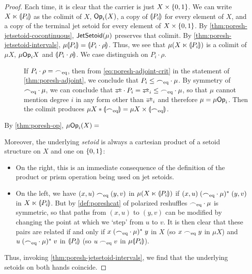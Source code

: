 \documentclass[a4paper]{memoir}
\begin{document}
\begin{proof}
	Each time, it is clear that the carrier is just $X \times \mathopen{}\left\{ 0, 1 \right\}\mathclose{}$.
	We can write $X \ltimes {\llparenthesis P_i \rrparenthesis}$ as the colimit of $X$, ${\mathsf{Op}}_i(X)$, a copy of ${\llparenthesis P_i \rrparenthesis}$ for every element of $X$, and a copy of the terminal jet setoid for every element of $X \times \mathopen{}\left\{ 0, 1 \right\}\mathclose{}$.
	By \cref{thm:poresh-jetsetoid-cocontinuous}, $\mathsf{JetSetoid}(\mu)$ preserves that colimit.
	By \cref{thm:poresh-jetsetoid-intervals}, $\mu {\llparenthesis P_i \rrparenthesis} = {\llparenthesis P_i \cdot \rho \rrparenthesis}$.
	Thus, we see that $\mu (X \ltimes {\llparenthesis P_i \rrparenthesis})$ is a colimit of $\mu X$, $\mu {\mathsf{Op}}_i X$ and ${\llparenthesis P_i \cdot \rho \rrparenthesis}$.
	We case distinguish on $P_i \cdot \rho$.
	\begin{description}
		\item[\framebox{$\eqtysym$}] If $P_i \cdot \rho = {\frown}_{{\mathrm{eq}}}$, then from \cref{eq:poresh-adjoint-crit} in the statement of \cref{thm:poresh-adjoint}, we conclude that $P_i \leq {\frown}_{{\mathrm{eq}}} \cdot \mu$.
		By symmetry of ${\frown}_{{\mathrm{eq}}} \cdot \mu$, we can conclude that $\infrajetsym \cdot P_i = \infrajetsym_i \leq \eqtysym \cdot \mu$, so that $\mu$ cannot mention degree $i$ in any form other than $\infrajetsym_i$ and therefore $\mu = \mu {\mathsf{Op}}_i$. Then the colimit produces $\mu X * {\llparenthesis \frown_{{\mathrm{eq}}} \rrparenthesis} = \mu X \times {\llparenthesis \frown_{{\mathrm{eq}}}\rrparenthesis}$.
		
		\item[] 
		
		\item[] 
	\end{description}
	
	
	By \cref{thm:poresh-op}, $\mu {\mathsf{Op}}_i(X) = $
	
	
	
	Moreover, the underlying \emph{setoid} is always a cartesian product of a setoid structure on $X$ and one on $\mathopen{}\left\{ 0, 1 \right\}\mathclose{}$:
	\begin{itemize}
		\item On the right, this is an immediate consequence of the definition of the product or prism operation being used on jet setoids.
		\item On the left, we have $(x, u) \frown_{{\mathrm{eq}}} (y, v)$ in $\mu(X \ltimes {\llparenthesis P_i \rrparenthesis})$ if $(x, u) \mathrel{({\frown}_{{\mathrm{eq}}} \cdot \mu)^*} (y, v)$ in $X \ltimes {\llparenthesis P_i \rrparenthesis}$.
		But by \cref{def:poreshcat} of polarized reshuffles ${\frown}_{{\mathrm{eq}}} \cdot \mu$ is symmetric, so that paths from $(x, u)$ to $(y, v)$ can be modified by changing the point at which we `step' from $u$ to $v$.
		It is then clear that these pairs are related if and only if $x \mathrel{({\frown}_{{\mathrm{eq}}} \cdot \mu)^*} y$ in $X$ (so $x \frown_{{\mathrm{eq}}} y$ in $\mu X$) and $u \mathrel{({\frown}_{{\mathrm{eq}}} \cdot \mu)^*} v$ in ${\llparenthesis P_i \rrparenthesis}$ (so $u \frown_{{\mathrm{eq}}} v$ in $\mu {\llparenthesis P_i \rrparenthesis}$).
	\end{itemize}
	Thus, invoking \cref{thm:poresh-jetsetoid-intervals}, we find that the underlying setoids on both hands coincide.
	

\end{proof}
\end{document}
